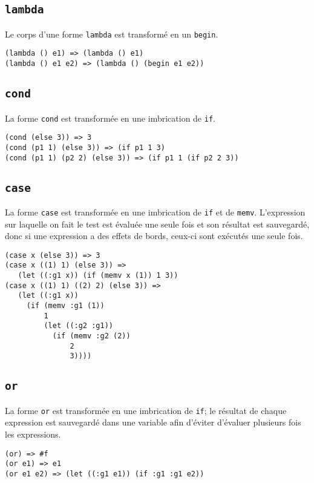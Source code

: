 \documentclass[11pt]{report}
\begin{document}
\subsection{\tt lambda}

Le corps d'une forme {\tt lambda} est transformé en un {\tt begin}.

\begin{verbatim}
(lambda () e1) => (lambda () e1)
(lambda () e1 e2) => (lambda () (begin e1 e2))
\end{verbatim}


\subsection{\tt cond}

La forme {\tt cond} est transformée en une imbrication de {\tt if}.


\begin{verbatim}
(cond (else 3)) => 3
(cond (p1 1) (else 3)) => (if p1 1 3)
(cond (p1 1) (p2 2) (else 3)) => (if p1 1 (if p2 2 3))
\end{verbatim}


\subsection{\tt case}

La forme {\tt case} est transformée en une imbrication de {\tt if} et
de {\tt memv}. L'expression sur laquelle on fait le test est évaluée
une seule fois et son résultat est sauvegardé, donc si une expression
a des effets de bords, ceux-ci sont exécutés une seule fois.


\begin{verbatim}
(case x (else 3)) => 3
(case x ((1) 1) (else 3)) =>
   (let ((:g1 x)) (if (memv x (1)) 1 3))
(case x ((1) 1) ((2) 2) (else 3)) =>
   (let ((:g1 x))
     (if (memv :g1 (1))
         1
         (let ((:g2 :g1))
           (if (memv :g2 (2))
               2
               3))))
\end{verbatim}

\subsection{\tt or}

La forme {\tt or} est transformée en une imbrication de {\tt if}; le
résultat de chaque expression est sauvegardé dans une variable afin
d'éviter d'évaluer plusieurs fois les expressions.


\begin{verbatim}
(or) => #f
(or e1) => e1
(or e1 e2) => (let ((:g1 e1)) (if :g1 :g1 e2))
\end{verbatim}
\end{document}
